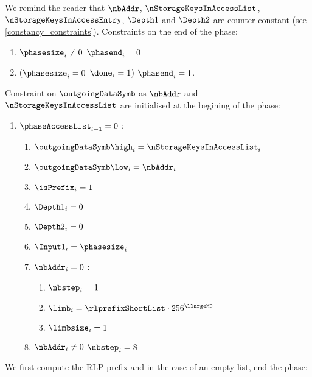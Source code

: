 \begin{center}
\end{center} 

We remind the reader that $\nbAddr$, $\nStorageKeysInAccessList$, $\nStorageKeysInAccessEntry$, $\Depth1$ and $\Depth2$ are counter-constant (see \ref{constancy_constraints}).
\newline
Constraints on the end of the phase:
\begin{enumerate}
	\item \If $\phasesize_{i} \neq 0$ \Then $\phasend_{i}=0$
	\item\label{constraint: end of access set phase} \If ($\phasesize_{i}=0$ \et $\done_{i}=1$) \Then $\phasend_{i}=1$.
\end{enumerate}
Constraint on $\outgoingDataSymb$ as $\nbAddr$ and $\nStorageKeysInAccessList$ are initialised at the begining of the phase:
\begin{enumerate}[resume]
	\item \If $\phaseAccessList_{i-1}=0$ \Then:
		\begin{enumerate}
			\item $\outgoingDataSymb\high_{i}=\nStorageKeysInAccessList_{i}$
			\item $\outgoingDataSymb\low_{i}=\nbAddr_{i}$
			\item $\isPrefix_{i}=1$
			\item $\Depth1_{i} = 0$
			\item $\Depth2_{i} = 0$
			\item $\Input1_{i} = \phasesize_{i}$
			\item \If $\nbAddr_{i}=0$ \Then: 
				\begin{enumerate}
					\item $\nbstep_{i}=1$
					\item $\limb_{i}=\rlprefixShortList \cdot 256 ^{\llargeMO}$
					\item $\limbsize_{i}=1$
				\end{enumerate}
			\item \If $\nbAddr_{i} \neq 0$ \Then $\nbstep_{i}=8$
		\end{enumerate} 
\end{enumerate}
We first compute the RLP prefix and in the case of an empty list, end the phase:

